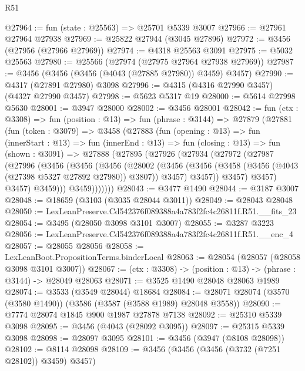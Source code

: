 \begin{lexlean}{R51}
\begin{coremodule}
@27964 := fun (state : @25563) => @25701 @5339 @3007
@27966 := @27961 @27964 @27938
@27969 := @25822 @27944 (@3045 @27896)
@27972 := @3456 (@27956 (@27966 @27969))
@27974 := @4318 @25563 @3091
@27975 := @5032 @25563
@27980 := @25566 (@27974 (@27975 @27964 @27938 @27969))
@27987 := @3456 (@3456 (@3456 (@4043 (@27885 @27980)) @3459) @3457)
@27990 := @4317 (@27891 @27980) @3098
@27996 := @4315 (@4316 @27990 @3457) (@4327 @27990 @3457)
@27998 := @5623 @5317 @19
@28000 := @5614 @27998 @5630
@28001 := @3947 @28000
@28002 := @3456 @28001
@28042 := fun (ctx : @3308) =>
  fun (position : @13) =>
  fun (phrase : @3144) =>
  @27879
    (@27881
      (fun (token : @3079) =>
      @3458
        (@27883
          (fun (opening : @13) =>
          fun (innerStart : @13) =>
          fun (innerEnd : @13) =>
          fun (closing : @13) =>
          fun (shown : @3091) =>
          @27888
            (@27895
              (@27926
                (@27934
                  (@27972
                    (@27987
                      (@27996
                        (@3456
                          (@3456
                            (@3456
                              (@28002
                                (@3456
                                  (@3456
                                    (@3458 (@3456 (@4043 (@27398 @5327 @27892 @27980)) @3807))
                                    @3457)
                                  @3457))
                              @3457)
                            @3457)
                          @3457)
                        @3459)))
                  @3459)))))))
@28043 := @3477 @1490
@28044 := @3187 @3007
@28048 := @18659 (@3103 (@3035 @28044 @3011))
@28049 := @28043 @28048
@28050 := LexLeanPreserve.Cd542376f089388a4a783f2fc4c26811f.R51.__fits_23
@28054 := @3495 (@28050 @3098 @3101 @3007)
@28055 := @3287 @3223
@28056 := LexLeanPreserve.Cd542376f089388a4a783f2fc4c26811f.R51.__enc_4
@28057 := @28055 @28056
@28058 := LexLeanBoot.PropositionTerms.binderLocal
@28063 := @28054 (@28057 (@28058 @3098 @3101 @3007))
@28067 := (ctx : @3308) -> (position : @13) -> (phrase : @3144) -> @28049 @28063
@28071 := @3525 @1490 @28048 @28063 @1989
@28074 := @3533 (@3549 @28044) @18684
@28084 := @28071 @28074 (@3570 (@3580 @1490)) (@3586 (@3587 (@3588 @1989) @28048 @3558))
@28090 := @7774 @28074 @1845 @900 @1987 @27878 @7138
@28092 := @25310 @5339 @3098
@28095 := @3456 (@4043 (@28092 @3095))
@28097 := @25315 @5339 @3098
@28098 := @28097 @3095
@28101 := @3456 (@3947 (@8108 @28098))
@28102 := @8114 @28098
@28109 := @3456 (@3456 (@3456 (@3732 (@7251 @28102)) @3459) @3457)

\end{coremodule}
\end{lexlean}
